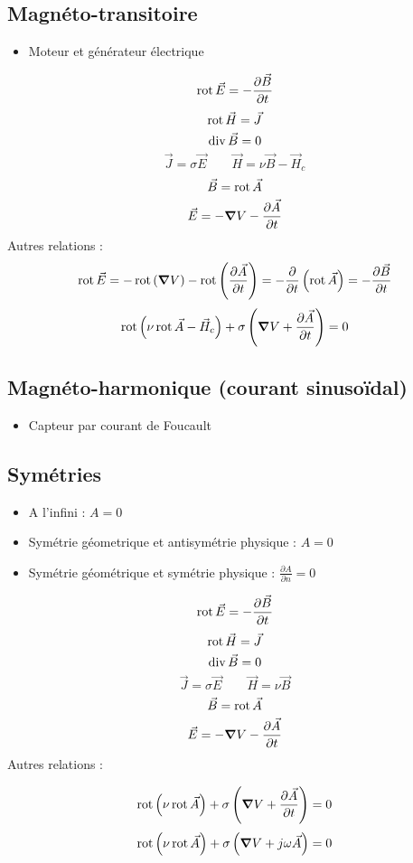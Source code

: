 \documentclass[resume]{subfiles}
\begin{document}
\subsection{Magnéto-transitoire}
\begin{itemize}
\item Moteur et générateur électrique
\end{itemize}

$$\operatorname{rot}{\vec{E}}=-\frac{\partial \vec{B}}{\partial t}$$
$$\operatorname{rot}{\vec{H}}=\vec{J}$$
$$\operatorname{div}{\vec{B}}=0$$
$$\vec{J}=\sigma\vec{E}\qquad \vec{H}=\nu\vec{B}-\vec{H}_c$$
$$\vec{B}=\operatorname{rot}{\vec{A}}$$
$$\vec{E}=-\grad V-\frac{\partial \vec{A}}{\partial t}$$
Autres relations :
$$\operatorname{rot}{\vec{E}}=-\operatorname{rot}\left(\grad V\right)-\operatorname{rot}\left(\frac{\partial \vec{A}}{\partial t}\right)=-\frac{\partial}{\partial t}\left(\operatorname{rot} \vec{A}\right)=-\frac{\partial \vec{B}}{\partial t}$$
$$\operatorname{rot}\left(\nu \operatorname{rot}\vec{A}-\vec{H}_c\right)+\sigma\left(\grad V+\frac{\partial \vec{A}}{\partial t}\right)=0$$


\subsection{Magnéto-harmonique (courant sinusoïdal)}
\begin{itemize}
\item Capteur par courant de Foucault
\end{itemize}
\subsection{Symétries}
\begin{itemize}
\item A l'infini : $A=0$
\item Symétrie géometrique et antisymétrie physique : $A=0$
\item Symétrie géométrique et symétrie physique : $\frac{\partial A}{\partial n}=0$
\end{itemize}


$$\operatorname{rot} \vec{E}=-\frac{\partial \vec{B}}{\partial t}$$
$$\operatorname{rot} \vec{H}=\vec{J}$$
$$\operatorname{div} \vec{B}=0$$
$$\vec{J}=\sigma \vec{E}\qquad \vec{H}=\nu \vec{B}$$
$$\vec{B}=\operatorname{rot} \vec{A}$$
$$\vec{E}=-\grad V-\frac{\partial \vec{A}}{\partial t}$$
Autres relations :

$$\operatorname{rot}\left(\nu \operatorname{rot}\vec{A}\right)+\sigma\left(\grad V+\frac{\partial \vec{A}}{\partial t}\right)=0$$
$$\operatorname{rot}\left(\nu \operatorname{rot}\vec{A}\right)+\sigma\left(\grad V+j\omega \vec{A}\right)=0$$
\end{document}
